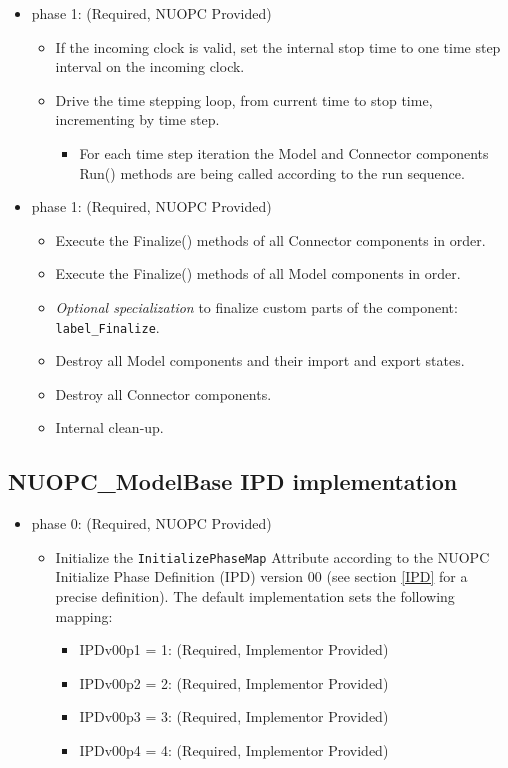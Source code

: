 \begin{itemize}
\item phase 1: ({\sc Required, NUOPC Provided})
  \begin{itemize}
  \item If the incoming clock is valid, set the internal stop time to one time step interval on the incoming clock.
  \item Drive the time stepping loop, from current time to stop time, incrementing by time step.
  \begin{itemize}
    \item For each time step iteration the Model and Connector components Run() methods are being called according to the run sequence.
  \end{itemize}  
  \end{itemize}    
\end{itemize}

\begin{itemize}
\item phase 1: ({\sc Required, NUOPC Provided})
  \begin{itemize}
  \item Execute the Finalize() methods of all Connector components in order.
  \item Execute the Finalize() methods of all Model components in order.
  \item {\it Optional specialization} to finalize custom parts of the component: {\tt label\_Finalize}.
  \item Destroy all Model components and their import and export states.
  \item Destroy all Connector components.
  \item Internal clean-up.
  \end{itemize}      
\end{itemize}

\subsection{NUOPC\_ModelBase IPD implementation}
\begin{itemize}
\item phase 0: ({\sc Required, NUOPC Provided})
  \begin{itemize}
  \item Initialize the {\tt InitializePhaseMap} Attribute according to the NUOPC Initialize Phase Definition (IPD) version 00 (see section \ref{IPD} for a precise definition). The default implementation sets the following mapping:
    \begin{itemize}
    \item IPDv00p1 = 1: ({\sc Required, Implementor Provided})
    \item IPDv00p2 = 2: ({\sc Required, Implementor Provided})
    \item IPDv00p3 = 3: ({\sc Required, Implementor Provided})
    \item IPDv00p4 = 4: ({\sc Required, Implementor Provided})
    \end{itemize}  
  \end{itemize}  
\end{itemize}

